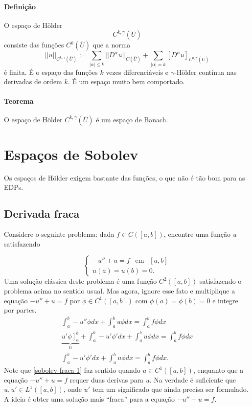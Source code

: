 \documentclass[a4paper, 11pt]{book}
\begin{document}
\paragraph{Definição} O espaço de Hölder
\[ C^{k,\gamma}(\overline{U}) \]
consiste das funções \( C^{k}(\overline{U}) \) que a norma \[ ||u||_{C^{k,\gamma}(\overline{U})} := \sum_{|\alpha|\leq k} || D^\alpha u ||_{C(\overline{U})} + \sum_{|\alpha|=k} [ D^\alpha u ]_{C^{0,\gamma}(\overline{U})} \] é finita. É o espaço das funções \( k\) vezes diferenciáveis e \( \gamma \)-Hölder contínua nas derivadas de ordem \( k \). É um espaço muito bem comportado.

\paragraph{Teorema} O espaço de Hölder \( C^{k,\gamma}(\overline{U}) \) é um espaço de Banach.


\section{Espaços de Sobolev}

Os espaços de Hölder exigem bastante das funções, o que não é tão bom para as EDPs.

\subsection*{Derivada fraca}

Considere o seguinte problema: dada $f \in C([a,b])$, encontre uma função $u$ satisfazendo

\[ \begin{cases}
-u'' +u =f \ \ \mbox{ em } \ \ [a,b] \\
	u(a)=u(b)=0.
\end{cases} \]
Uma solução clássica deste problema é uma função $C^2([a,b])$ satisfazendo o problema acima no sentido usual. Mas agora, ignore esse fato e multiplique a equação $-u'' +u =f $ por $\phi \in C^1([a,b])$ com $\phi(a)=\phi(b)=0$ e integre por partes.
\begin{align}\label{sobolev-fraca-1}
\int_a^b -u'' \phi dx +  \int_a^b u \phi dx =  \int_a^b f \phi dx\nonumber \\
\underbrace{\left. u' \phi \right]_a^b}_{0} + \int_a^b -u' \phi' dx +  \int_a^b u \phi dx =  \int_a^b f \phi dx \nonumber\\
\int_a^b -u' \phi' dx +  \int_a^b u \phi dx =  \int_a^b f \phi dx .
\end{align}
Note que \eqref{sobolev-fraca-1} faz sentido quando $u \in C^1([a,b])$, enquanto que a equação  $-u'' +u =f $ requer duas derivas para $u$. Na verdade é suficiente que $u, u' \in L^1([a,b])$, onde $u'$ tem um significado que ainda precisa ser formulado. A ideia é obter uma solução mais ``fraca'' para a equação $-u'' +u =f $.
\end{document}
